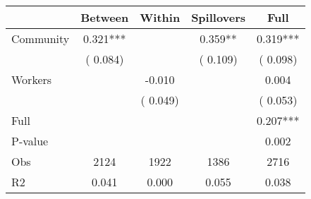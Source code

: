 
\begin{tabular}{l*{4}{c}}\hline&\multicolumn{1}{c}{Between}&\multicolumn{1}{c}{Within}&\multicolumn{1}{c}{Spillovers}&\multicolumn{1}{c}{Full}\\ \hline
 Community             &              0.321***      &                                               &        0.359** &         0.319***                            \\ 
                               &        (       0.084)           &                                       &       (       0.109)     &      (       0.098)                                           \\ 
 Workers       &                                               &       -0.010    &                                &             0.004                            \\ 
                               &                                               & (       0.049)                  &                                        &      (       0.053)                                           \\ 
\hline                                                                                                                                                                                                                                            
 Full                  &                                               &                                               &                                        &             0.207***                                     \\ 
 P-value               &                                               &                                               &                                        &             0.002                                           \\ 
 Obs                   &               2124               &       1922                       &       1386                &              2716                                               \\ 
 R2                    &                      0.041              &              0.000                      &              0.055               &                     0.038                                              \\ 
\hline \end{tabular}                                                                                                                                                                                                              